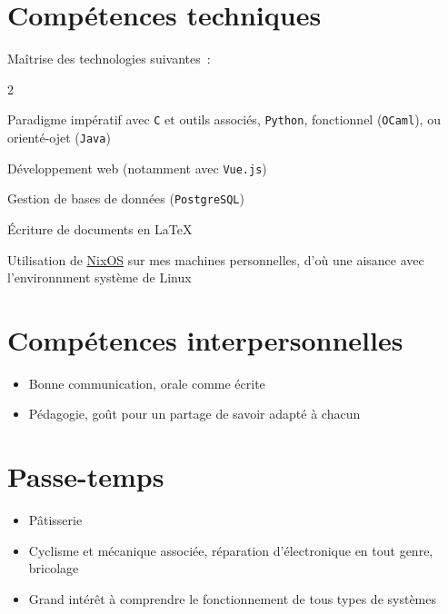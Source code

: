 \documentclass[11pt,a4paper,sans]{moderncv}
\begin{document}
\section{Compétences techniques}
Maîtrise des technologies suivantes~:
\begin{itemize}[left=0pt, label=\textbullet]
\begin{multicols}{2}
\item Paradigme impératif avec \texttt{C} et outils associés, \texttt{Python}, fonctionnel (\texttt{OCaml}), ou orienté-ojet (\texttt{Java})
\item Développement web (notamment avec \texttt{Vue.js})
\item Gestion de bases de données (\texttt{PostgreSQL})
\item Écriture de documents en \LaTeX
\item Utilisation de \href{https://fr.wikipedia.org/wiki/NixOS}{NixOS} sur mes machines personnelles, d'où une aisance avec l'environnment système de Linux
\end{multicols}
\end{itemize}

\noindent
\begin{minipage}[t]{0.48\textwidth}  %
\section{Compétences interpersonnelles}
\begin{itemize}[left=0pt, label=\textbullet]
    \item Bonne communication, orale comme écrite
    \item Pédagogie, goût pour un partage de savoir adapté à chacun
\end{itemize}
\end{minipage}
\hfill
\begin{minipage}[t]{0.48\textwidth}  %
\section{Passe-temps}
\begin{itemize}[left=0pt, label=\textbullet]
    \item Pâtisserie
    \item Cyclisme et mécanique associée, réparation d'électronique en tout genre, bricolage
    \item Grand intérêt à comprendre le fonctionnement de tous types de systèmes
\end{itemize}
\end{minipage}
\end{document}
